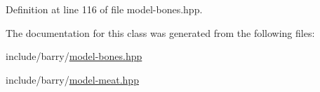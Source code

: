 Definition at line 116 of file model-\/bones.\+hpp.



The documentation for this class was generated from the following files\+:\begin{DoxyCompactItemize}
\item 
include/barry/\hyperlink{model-bones_8hpp}{model-\/bones.\+hpp}\item 
include/barry/\hyperlink{model-meat_8hpp}{model-\/meat.\+hpp}\end{DoxyCompactItemize}
